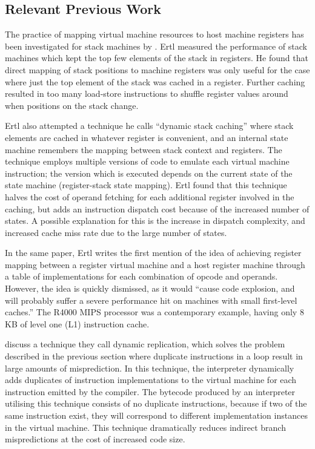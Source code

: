		\subsection{Relevant Previous Work}
		The practice of mapping virtual machine resources to host machine registers has been investigated for stack machines by \cite{stackcaching}. Ertl measured the performance of stack machines which kept the top few elements of the stack in registers. He found that direct mapping of stack positions to machine registers was only useful for the case where just the top element of the stack was cached in a register. Further caching resulted in too many load-store instructions to shuffle register values around when positions on the stack change.
		
		Ertl also attempted a technique he calls ``dynamic stack caching'' where stack elements are cached in whatever register is convenient, and an internal state machine remembers the mapping between stack context and registers. The technique employs multiple versions of code to emulate each virtual machine instruction; the version which is executed depends on the current state of the state machine (register-stack state mapping). Ertl found that this technique halves the cost of operand fetching for each additional register involved in the caching, but adds an instruction dispatch cost because of the increased number of states. A possible explanation for this is the increase in dispatch complexity, and increased cache miss rate due to the large number of states.
		
		In the same paper, Ertl writes the first mention of the idea of achieving register mapping between a register virtual machine and a host register machine through a table of implementations for each combination of opcode and operands. However, the idea is quickly dismissed, as it would ``cause code explosion, and will probably suffer a severe performance hit on machines with small first-level caches.'' The R4000 MIPS processor was a contemporary example, having only 8 KB of level one (L1) instruction cache.
		
		\cite{optimizingindirectbranch} discuss a technique they call dynamic replication, which solves the problem described in the previous section where duplicate instructions in a loop result in large amounts of misprediction. In this technique, the interpreter dynamically adds duplicates of instruction implementations to the virtual machine for each instruction emitted by the compiler. The bytecode produced by an interpreter utilising this technique consists of no duplicate instructions, because if two of the same instruction exist, they will correspond to different implementation instances in the virtual machine. This technique dramatically reduces indirect branch mispredictions at the cost of increased code size.
	
